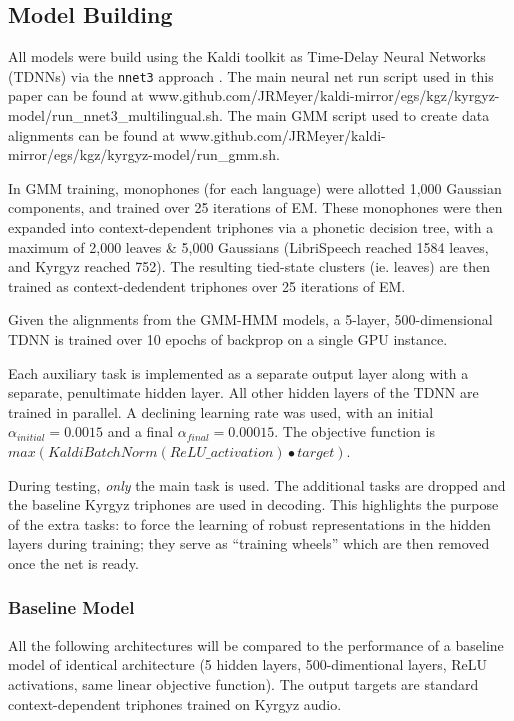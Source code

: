 \documentclass[a4paper]{article}
\begin{document}
\subsection{Model Building}

All models were build using the Kaldi toolkit as Time-Delay Neural Networks (TDNNs) via the \texttt{nnet3} approach \cite{povey2011,peddinti2015}. The main neural net run script used in this paper can be found at www.github.com/JRMeyer/kaldi-mirror/egs/kgz/kyrgyz-model/run\_nnet3\_multilingual.sh. The main GMM script used to create data alignments can be found at www.github.com/JRMeyer/kaldi-mirror/egs/kgz/kyrgyz-model/run\_gmm.sh.

In GMM training, monophones (for each language) were allotted 1,000 Gaussian components, and trained over 25 iterations of EM. These monophones were then expanded into context-dependent triphones via a phonetic decision tree, with a maximum of 2,000 leaves \& 5,000 Gaussians (LibriSpeech reached 1584 leaves, and Kyrgyz reached 752). The resulting tied-state clusters (ie. leaves) are then trained as context-dedendent triphones over 25 iterations of EM.

Given the alignments from the GMM-HMM models, a 5-layer, 500-dimensional TDNN is trained over 10 epochs of backprop on a single GPU instance.

Each auxiliary task is implemented as a separate output layer along with a separate, penultimate hidden layer. All other hidden layers of the TDNN are trained in parallel. A declining learning rate was used, with an initial $\alpha_{initial}=0.0015$ and a final $\alpha_{final}=0.00015$. The objective function is $max( KaldiBatchNorm(ReLU\_activation) \bullet target )$.

During testing, \textit{only} the main task is used. The additional tasks are dropped and the baseline Kyrgyz triphones are used in decoding. This highlights the purpose of the extra tasks: to force the learning of robust representations in the hidden layers during training; they serve as ``training wheels'' which are then removed once the net is ready.



\subsubsection{Baseline Model}

All the following architectures will be compared to the performance of a baseline model of identical architecture (5 hidden layers, 500-dimentional layers, ReLU activations, same linear objective function). The output targets are standard context-dependent triphones trained on Kyrgyz audio.
\end{document}
